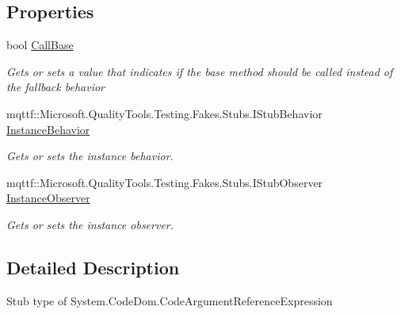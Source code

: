 \subsection*{Properties}
\begin{DoxyCompactItemize}
\item 
bool \hyperlink{class_system_1_1_code_dom_1_1_fakes_1_1_stub_code_argument_reference_expression_a5ca292b6656a83c87e5c46aa42e49f85}{Call\-Base}
\begin{DoxyCompactList}\small\item\em Gets or sets a value that indicates if the base method should be called instead of the fallback behavior\end{DoxyCompactList}\item 
mqttf\-::\-Microsoft.\-Quality\-Tools.\-Testing.\-Fakes.\-Stubs.\-I\-Stub\-Behavior \hyperlink{class_system_1_1_code_dom_1_1_fakes_1_1_stub_code_argument_reference_expression_a65457afffa3b3610e87cd640f5dfd6c0}{Instance\-Behavior}
\begin{DoxyCompactList}\small\item\em Gets or sets the instance behavior.\end{DoxyCompactList}\item 
mqttf\-::\-Microsoft.\-Quality\-Tools.\-Testing.\-Fakes.\-Stubs.\-I\-Stub\-Observer \hyperlink{class_system_1_1_code_dom_1_1_fakes_1_1_stub_code_argument_reference_expression_a68986f9680bb5c2c583bf4a842bb1823}{Instance\-Observer}
\begin{DoxyCompactList}\small\item\em Gets or sets the instance observer.\end{DoxyCompactList}\end{DoxyCompactItemize}


\subsection{Detailed Description}
Stub type of System.\-Code\-Dom.\-Code\-Argument\-Reference\-Expression




